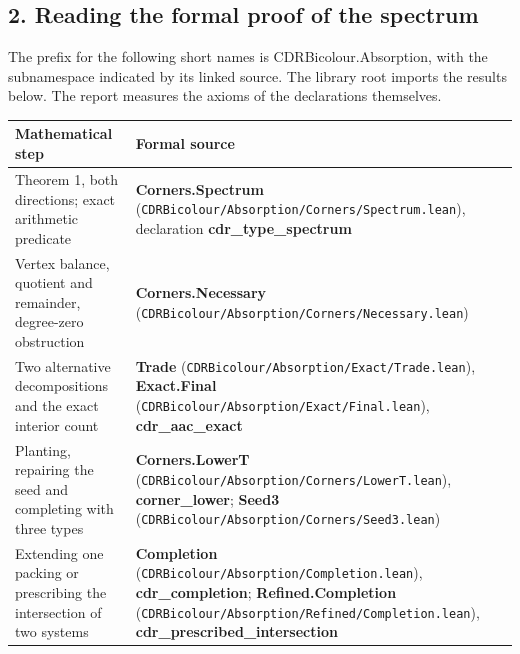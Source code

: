 \documentclass[english,11pt,a4paper]{article}
\begin{document}
\subsection{2. Reading the formal proof of the spectrum}\label{reading-the-formal-proof-of-the-spectrum}

The prefix for the following short names is CDRBicolour.Absorption, with the subnamespace indicated by its linked source. The library root imports the results below. The report measures the axioms of the declarations themselves.

{\begin{longtable}[]{@{}
  >{\raggedright\arraybackslash}p{}
  >{\raggedright\arraybackslash}p{}@{}}
\toprule\noalign{}
\begin{minipage}[b]{\linewidth}\raggedright
Mathematical step
\end{minipage} & \begin{minipage}[b]{\linewidth}\raggedright
Formal source
\end{minipage} \\
\midrule\noalign{}
\endhead
\bottomrule\noalign{}
\endlastfoot
Theorem 1, both directions; exact arithmetic predicate & \textbf{Corners.Spectrum} (\texttt{CDRBicolour/\allowbreak{}Absorption/\allowbreak{}Corners/\allowbreak{}Spectrum.\allowbreak{}lean}), declaration \textbf{cdr\_\allowbreak{}type\_\allowbreak{}spectrum} \\
Vertex balance, quotient and remainder, degree-zero obstruction & \textbf{Corners.Necessary} (\texttt{CDRBicolour/\allowbreak{}Absorption/\allowbreak{}Corners/\allowbreak{}Necessary.\allowbreak{}lean}) \\
Two alternative decompositions and the exact interior count & \textbf{Trade} (\texttt{CDRBicolour/\allowbreak{}Absorption/\allowbreak{}Exact/\allowbreak{}Trade.\allowbreak{}lean}), \textbf{Exact.Final} (\texttt{CDRBicolour/\allowbreak{}Absorption/\allowbreak{}Exact/\allowbreak{}Final.\allowbreak{}lean}), \textbf{cdr\_\allowbreak{}aac\_\allowbreak{}exact} \\
Planting, repairing the seed and completing with three types & \textbf{Corners.LowerT} (\texttt{CDRBicolour/\allowbreak{}Absorption/\allowbreak{}Corners/\allowbreak{}Lower\allowbreak{}T.\allowbreak{}lean}), \textbf{corner\_\allowbreak{}lower}; \textbf{Seed3} (\texttt{CDRBicolour/\allowbreak{}Absorption/\allowbreak{}Corners/\allowbreak{}Seed3.\allowbreak{}lean}) \\
Extending one packing or prescribing the intersection of two systems & \textbf{Completion} (\texttt{CDRBicolour/\allowbreak{}Absorption/\allowbreak{}Completion.\allowbreak{}lean}), \textbf{cdr\_\allowbreak{}completion}; \textbf{Refined.Completion} (\texttt{CDRBicolour/\allowbreak{}Absorption/\allowbreak{}Refined/\allowbreak{}Completion.\allowbreak{}lean}), \textbf{cdr\_\allowbreak{}prescribed\_\allowbreak{}intersection} \\

\end{longtable}}
\end{document}
